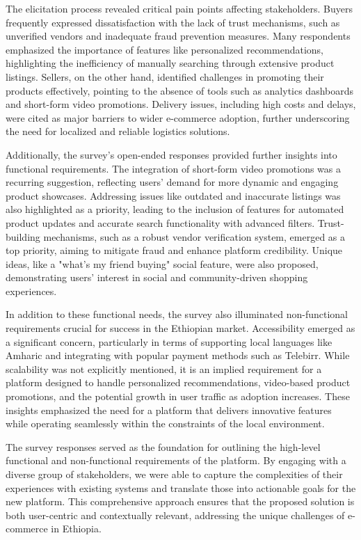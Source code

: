 \documentclass[12pt]{report}
\begin{document}
The elicitation process revealed critical pain points affecting stakeholders. Buyers frequently
expressed dissatisfaction with the lack of trust mechanisms, such as unverified vendors and
inadequate fraud prevention measures. Many respondents emphasized the importance of
features like personalized recommendations, highlighting the inefficiency of manually
searching through extensive product listings. Sellers, on the other hand, identified challenges
in promoting their products effectively, pointing to the absence of tools such as analytics
dashboards and short-form video promotions. Delivery issues, including high costs and
delays, were cited as major barriers to wider e-commerce adoption, further underscoring the
need for localized and reliable logistics solutions.

Additionally, the survey’s open-ended responses provided further insights into functional
requirements. The integration of short-form video promotions was a recurring suggestion,
reflecting users' demand for more dynamic and engaging product showcases. Addressing
issues like outdated and inaccurate listings was also highlighted as a priority, leading to the
inclusion of features for automated product updates and accurate search functionality with
advanced filters. Trust-building mechanisms, such as a robust vendor verification system,
emerged as a top priority, aiming to mitigate fraud and enhance platform credibility. Unique
ideas, like a "what’s my friend buying" social feature, were also proposed, demonstrating
users’ interest in social and community-driven shopping experiences.

In addition to these functional needs, the survey also illuminated non-functional requirements
crucial for success in the Ethiopian market. Accessibility emerged as a significant concern,
particularly in terms of supporting local languages like Amharic and integrating with popular
payment methods such as Telebirr. While scalability was not explicitly mentioned, it is an
implied requirement for a platform designed to handle personalized recommendations,
video-based product promotions, and the potential growth in user traffic as adoption
increases. These insights emphasized the need for a platform that delivers innovative features
while operating seamlessly within the constraints of the local environment.

The survey responses served as the foundation for outlining the high-level functional and
non-functional requirements of the platform. By engaging with a diverse group of
stakeholders, we were able to capture the complexities of their experiences with existing
systems and translate those into actionable goals for the new platform. This comprehensive
approach ensures that the proposed solution is both user-centric and contextually relevant,
addressing the unique challenges of e-commerce in Ethiopia.
\end{document}

